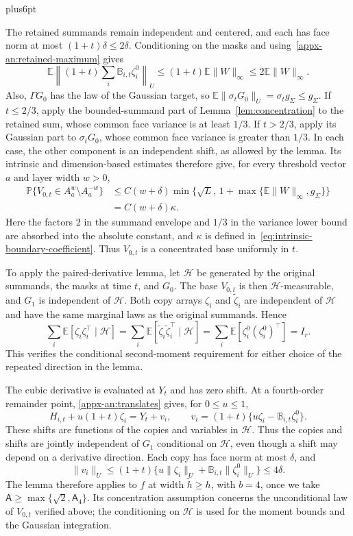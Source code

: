 \documentclass[11pt,letterpaper,twoside,leqno]{article}
\makeatletter
\theoremstyle{bookplain}
\theoremstyle{bookremark}
\renewenvironment{proof}[1][\proofname]{\par
  \pushQED{\qed}\normalfont\topsep6pt plus6pt\relax
  \trivlist\item[\hskip\labelsep\bfseries #1\@addpunct{.}]\ignorespaces
}{\popQED\endtrivlist\@endpefalse}
\newcommand{\E}{\mathbb E}
\newcommand{\Pp}{\mathbb P}
\makeatother
\begin{document}
\begin{proof}[Proof of the seeded estimates~\eqref{eq:seeded-derivatives}]
The retained summands remain independent and centered, and each
has face norm at most $(1+t)\delta\le2\delta$. Conditioning on
the masks and using~\eqref{appx-an:retained-maximum} gives
\[
 \E\left\|(1+t)\sum_i\mathbb B_{i,t}\zeta_i^0\right\|_U
 \le(1+t)\E\|W\|_\infty\le2\E\|W\|_\infty.
\]
Also, $\Gamma G_0$ has the law of the Gaussian target, so
$\E\|\sigma_tG_0\|_U=\sigma_tg_\Sigma\le g_\Sigma$.
If $t\le2/3$, apply the bounded-summand part of
Lemma~\ref{lem:concentration} to the retained sum, whose common
face variance is at least $1/3$. If $t>2/3$, apply its Gaussian
part to $\sigma_tG_0$, whose common face variance is greater
than $1/3$. In each case, the other component is an independent
shift, as allowed by the lemma. Its intrinsic and
dimension-based estimates therefore give, for every threshold
vector $a$ and layer width $w>0$,
\[
 \begin{aligned}
 \Pp\{V_{0,t}\in A_a^w\setminus A_a^{-w}\}
 &\le C(w+\delta)
       \min\{\sqrt L,\,1+\max\{\E\|W\|_\infty,g_\Sigma\}\}\\
 &=C(w+\delta)\kappa.
 \end{aligned}
\]
Here the factors $2$ in the summand envelope and $1/3$ in the
variance lower bound are absorbed into the absolute constant,
and $\kappa$ is defined in~\eqref{eq:intrinsic-boundary-coefficient}.
Thus $V_{0,t}$ is a concentrated base uniformly in $t$.

To apply the paired-derivative lemma, let $\mathcal H$ be
generated by the original summands, the masks at time $t$, and
$G_0$. The base $V_{0,t}$ is then $\mathcal H$-measurable, and
$G_1$ is independent of $\mathcal H$. Both copy arrays
$\zeta_i$ and $\widetilde\zeta_i$ are independent of
$\mathcal H$ and have the same marginal laws as the original
summands. Hence
\[
 \sum_i\E[\zeta_i\zeta_i^\top\mid\mathcal H]
 =\sum_i\E[\widetilde\zeta_i\widetilde\zeta_i^\top
                     \mid\mathcal H]
 =\sum_i\E[\zeta_i^0(\zeta_i^0)^\top]=I_r.
\]
This verifies the conditional second-moment requirement for
either choice of the repeated direction in the lemma.

The cubic derivative is evaluated at $Y_t$ and has zero shift.
At a fourth-order remainder point, 
\eqref{appx-an:translates} gives, for $0\le u\le1$,
\[
 H_{i,t}+u(1+t)\zeta_i=Y_t+v_i,\qquad
 v_i=(1+t)\{u\zeta_i-\mathbb B_{i,t}\zeta_i^0\}.
\]
These shifts are functions of the copies and variables in
$\mathcal H$. Thus the copies and shifts are jointly independent
of $G_1$ conditional on $\mathcal H$, even though a shift may
depend on a derivative direction. Each copy has face norm at
most $\delta$, and
\[
 \|v_i\|_U
 \le(1+t)\{u\|\zeta_i\|_U
                  +\mathbb B_{i,t}\|\zeta_i^0\|_U\}
 \le4\delta.
\]
The lemma therefore applies to $f$ at width
$\widetilde h\ge h$, with $b=4$, once we take
$\mathsf A\ge\max\{\sqrt2,\mathsf A_4\}$. Its concentration
assumption concerns the unconditional law of $V_{0,t}$ verified
above; the conditioning on $\mathcal H$ is used for the moment
bounds and the Gaussian integration.


\end{proof}
\end{document}
